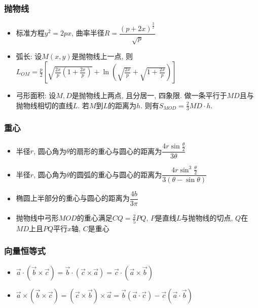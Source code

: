 \documentclass[landscape, twocolumn, 8pt, a4paper, twoside]{extarticle}
\begin{document}
    \subsubsection{抛物线}
    \begin{itemize}
    \item 标准方程$y^2 = 2px$, 曲率半径$ R = \dfrac{(p + 2x)^{\frac{3}{2} }}{\sqrt{p}}$
    \item 弧长: 设$M(x, y)$是抛物线上一点, 则$L_{OM} = \frac{p}{2} [ \sqrt{\frac{2x}{p}(1 + \frac{2x}{p})} + \ln(\sqrt{\frac{2x}{p}} + \sqrt{1 + \frac{2x}{p}})]$
    \item 弓形面积: 设$M, D$是抛物线上两点, 且分居一, 四象限. 做一条平行于$MD$且与抛物线相切的直线$L$. 若$M$到$L$的距离为$h$. 则有$S_{MOD} = \frac{2}{3}MD \cdot h$.
    \end{itemize}

    \subsubsection{重心}
    \begin{itemize}
    \item 半径$r$, 圆心角为$\theta$的扇形的重心与圆心的距离为$\dfrac{4r\sin\frac{\theta}{2}}{3\theta}$
    \item 半径$r$, 圆心角为$\theta$的圆弧的重心与圆心的距离为$\dfrac{4r\sin^3\frac{\theta}{2}}{3(\theta - \sin\theta)}$
    \item 椭圆上半部分的重心与圆心的距离为$\dfrac{4b}{3\pi}$
    \item  抛物线中弓形$MOD$的重心满足$CQ = \frac{2}{5} PQ$, $P$是直线$L$与抛物线的切点, $Q$在$MD$上且$PQ$平行$x$轴, $C$是重心
    \end{itemize}

    \subsubsection{向量恒等式}
    \begin{itemize}
    \item $\vec{a} \cdot (\vec{b} \times \vec{c}) = \vec{b} \cdot (\vec{c} \times \vec{a}) = \vec{c} \cdot (\vec{a} \times \vec{b})$
    \item $\vec{a} \times (\vec{b} \times \vec{c}) = (\vec{c} \times \vec{b}) \times \vec{a} = \vec{b}(\vec{a} \cdot \vec{c}) - \vec{c}(\vec{a} \cdot \vec{b})$
    \end{itemize}
\end{document}
